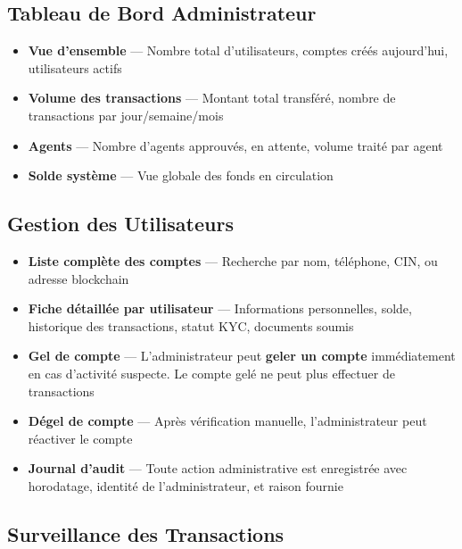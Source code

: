 \documentclass[11pt,a4paper]{article}
\begin{document}
\subsection{Tableau de Bord Administrateur}

\begin{itemize}[leftmargin=*]
    \item \textbf{Vue d'ensemble} --- Nombre total d'utilisateurs, comptes cr\'e\'es aujourd'hui, utilisateurs actifs
    \item \textbf{Volume des transactions} --- Montant total transf\'er\'e, nombre de transactions par jour/semaine/mois
    \item \textbf{Agents} --- Nombre d'agents approuv\'es, en attente, volume trait\'e par agent
    \item \textbf{Solde syst\`eme} --- Vue globale des fonds en circulation
\end{itemize}

\subsection{Gestion des Utilisateurs}

\begin{itemize}[leftmargin=*]
    \item \textbf{Liste compl\`ete des comptes} --- Recherche par nom, t\'el\'ephone, CIN, ou adresse blockchain
    \item \textbf{Fiche d\'etaill\'ee par utilisateur} --- Informations personnelles, solde, historique des transactions, statut KYC, documents soumis
    \item \textbf{Gel de compte} --- L'administrateur peut \textbf{geler un compte} imm\'ediatement en cas d'activit\'e suspecte. Le compte gel\'e ne peut plus effectuer de transactions
    \item \textbf{D\'egel de compte} --- Apr\`es v\'erification manuelle, l'administrateur peut r\'eactiver le compte
    \item \textbf{Journal d'audit} --- Toute action administrative est enregistr\'ee avec horodatage, identit\'e de l'administrateur, et raison fournie
\end{itemize}

\subsection{Surveillance des Transactions}
\end{document}
